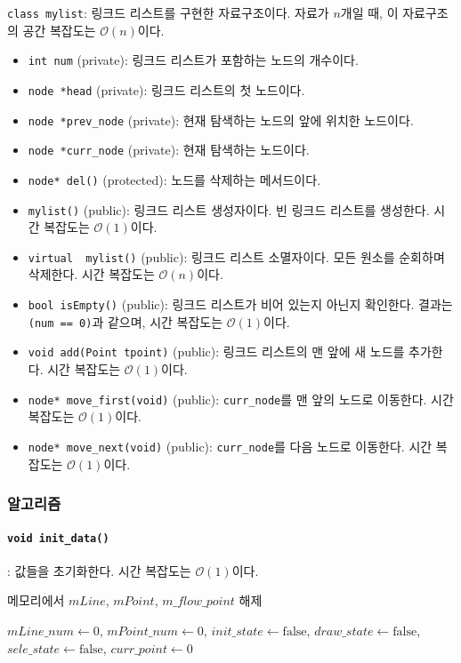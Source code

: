 \texttt{class mylist}: 링크드 리스트를 구현한 자료구조이다. 자료가 $n$개일 때, 이 자료구조의 공간 복잡도는 $\mathcal{O}\left(n\right)$이다.
\begin{itemize}
	\item \texttt{int num} (private): 링크드 리스트가 포함하는 노드의 개수이다.
	\item \texttt{node *head} (private): 링크드 리스트의 첫 노드이다.
	\item \texttt{node *prev_node} (private): 현재 탐색하는 노드의 앞에 위치한 노드이다.
	\item \texttt{node *curr_node} (private): 현재 탐색하는 노드이다.
	\item \texttt{node* del()} (protected): 노드를 삭제하는 메서드이다.
	\item \texttt{mylist()} (public): 링크드 리스트 생성자이다. 빈 링크드 리스트를 생성한다. 시간 복잡도는 $\mathcal{O}\left(1\right)$이다.
	\item \texttt{virtual ~mylist()} (public): 링크드 리스트 소멸자이다. 모든 원소를 순회하며 삭제한다. 시간 복잡도는 $\mathcal{O}\left(n\right)$이다.
	\item \texttt{bool isEmpty()} (public): 링크드 리스트가 비어 있는지 아닌지 확인한다. 결과는 \texttt{(num == 0)}과 같으며, 시간 복잡도는 $\mathcal{O}\left(1\right)$이다.
	\item \texttt{void add(Point tpoint)} (public): 링크드 리스트의 맨 앞에 새 노드를 추가한다. 시간 복잡도는 $\mathcal{O}\left(1\right)$이다.
	\item \texttt{node* move_first(void)} (public): \texttt{curr_node}를 맨 앞의 노드로 이동한다. 시간 복잡도는 $\mathcal{O}\left(1\right)$이다.
	\item \texttt{node* move_next(void)} (public): \texttt{curr_node}를 다음 노드로 이동한다. 시간 복잡도는 $\mathcal{O}\left(1\right)$이다.
\end{itemize}

\subsubsection{알고리즘}

\paragraph{\texttt{void init_data()}}: 값들을 초기화한다. 시간 복잡도는 $\mathcal{O}\left(1\right)$이다.
\begin{algorithm}
	\item 메모리에서 $mLine$, $mPoint$, $m\_flow\_point$ 해제
	\item $mLine\_num \leftarrow 0$, $mPoint\_num \leftarrow 0$, $init\_state \leftarrow \mathrm{false}$, $draw\_state \leftarrow \mathrm{false}$, $sele\_state \leftarrow \mathrm{false}$, $curr\_point \leftarrow 0$
\end{algorithm}

